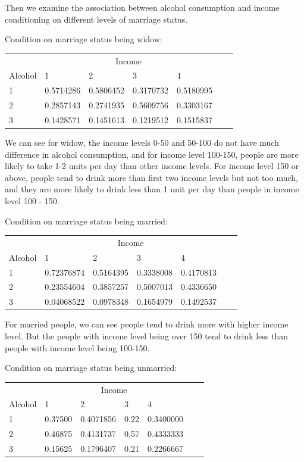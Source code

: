 \documentclass{article}
\begin{document}
    Then we examine the association between alcohol consumption and income conditioning on different levels of marriage status.

    Condition on marriage status being widow:
        \begin{center}
    	\begin{tabular}{lllllll}
    	\toprule
    	& \multicolumn{4}{c}{Income}\\
Alcohol &     1        &  2       &  3       &   4     \\
\midrule
1& 0.5714286 &0.5806452 &0.3170732 &0.5180995\\
2& 0.2857143 &0.2741935 &0.5609756 &0.3303167\\
3& 0.1428571 &0.1451613 &0.1219512 &0.1515837\\
    	\bottomrule
    	\end{tabular}
    \end{center}

    We can see for widow, the income levels 0-50 and 50-100 do not have much difference in alcohol consumption, and for income level 100-150, people are more likely to take 1-2 units per day than other income levels. For income level 150 or above, people tend to drink more than first two income levels but not too much, and they are more likely to drink less than 1 unit per day than people in income level 100 - 150.

        Condition on marriage status being married:
        \begin{center}
    	\begin{tabular}{lllllll}
    	\toprule
    	& \multicolumn{4}{c}{Income}\\
Alcohol &     1        &  2       &  3       &   4     \\
\midrule
1& 0.72376874& 0.5164395 &0.3338008 &0.4170813\\
2& 0.23554604& 0.3857257 &0.5007013 &0.4336650\\
3& 0.04068522& 0.0978348 &0.1654979 &0.1492537\\
    	\bottomrule
    	\end{tabular}
    \end{center}

    For married people, we can see people tend to drink more with higher income level. But the people with income level being over 150 tend to drink less than people with income level being 100-150.   

            Condition on marriage status being unmarried:
        \begin{center}
    	\begin{tabular}{lllllll}
    	\toprule
    	& \multicolumn{4}{c}{Income}\\
Alcohol &     1        &  2       &  3       &   4     \\
\midrule
1& 0.37500 &0.4071856 &0.22 &0.3400000\\
2& 0.46875 &0.4131737 &0.57 &0.4333333\\
3& 0.15625 &0.1796407 &0.21 &0.2266667\\
    	\bottomrule
    	\end{tabular}
    \end{center}
\end{document}
